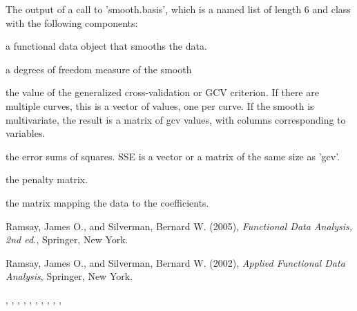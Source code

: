 \begin{Value}
The output of a call to 'smooth.basis', which is a named list of
length 6 and class  with the following components:  

\begin{ldescription}
\item[\code{fd}] a functional data object that smooths the data.

\item[\code{df}] a degrees of freedom measure of the smooth

\item[\code{gcv}] the value of the generalized cross-validation or GCV criterion.  If
there are multiple curves, this is a vector of values, one per
curve.  If the smooth is multivariate, the result is a matrix of gcv
values, with columns corresponding to variables.  

\item[\code{SSE}] the error sums of squares.  SSE is a vector or a matrix of the same
size as 'gcv'. 

\item[\code{penmat}] the penalty matrix.

\item[\code{y2cMap}] the matrix mapping the data to the coefficients.

\end{ldescription}
\end{Value}
\begin{References}\relax
Ramsay, James O., and Silverman, Bernard W. (2005), \emph{Functional 
Data Analysis, 2nd ed.}, Springer, New York. 

Ramsay, James O., and Silverman, Bernard W. (2002), \emph{Applied
Functional Data Analysis}, Springer, New York.
\end{References}
\begin{SeeAlso}\relax
{}, 
, 
, 
, 
, 
, 
, 
, 
, 
, 
\end{SeeAlso}
